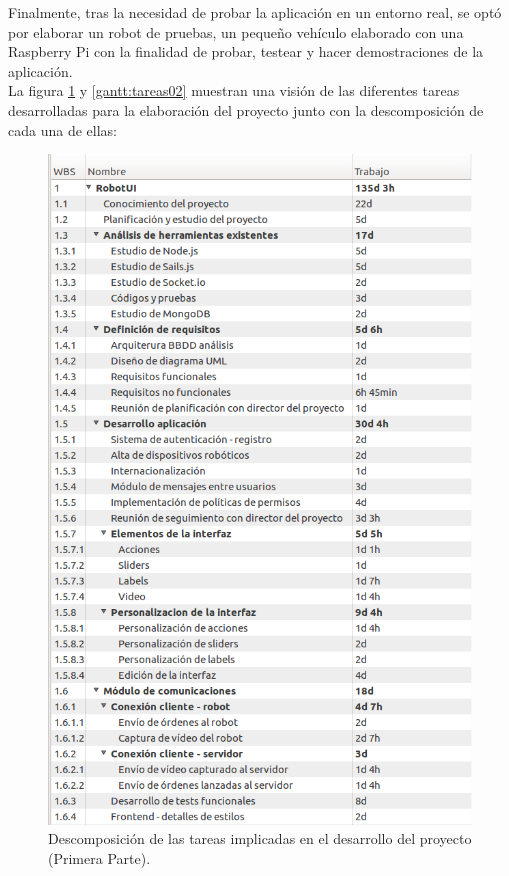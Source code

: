 \documentclass[a4paper,12pt]{article}
\begin{document}
Finalmente, tras la necesidad de probar la aplicación en un entorno real, se optó por elaborar un robot de pruebas, un pequeño vehículo elaborado con una Raspberry Pi con la finalidad de probar, testear y hacer 
demostraciones de la aplicación.\\

La figura \ref{gantt:tareas01} y \ref{gantt:tareas02} muestran una visión de las diferentes tareas desarrolladas para la elaboración del proyecto junto con la descomposición de cada una de ellas:\\

\begin{figure}[H]
  \begin{center}
    \includegraphics[scale=0.6]{imagenes/descomposicion_tareas01.png}
  \end{center}
  \caption{Descomposición de las tareas implicadas en el desarrollo del proyecto (Primera Parte).}
  \label{gantt:tareas01}
\end{figure}
\end{document}
